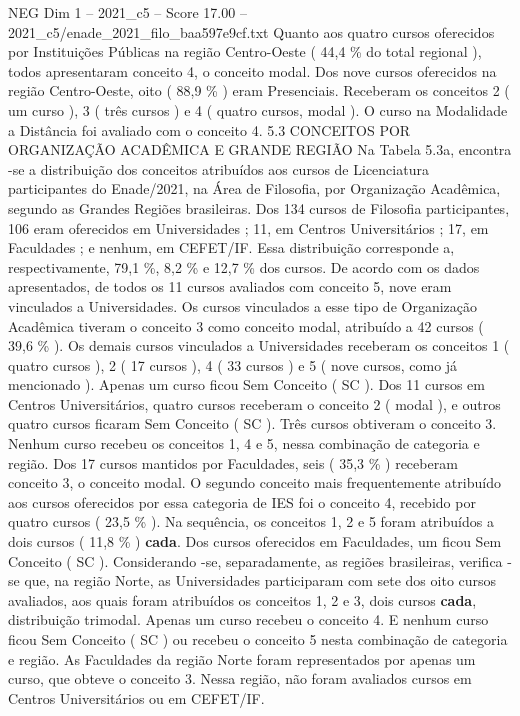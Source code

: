 \begin{textsample}{NEG Dim 1 – 2021\_c5 – Score 17.00 – 2021\_c5/enade\_2021\_filo\_baa597e9cf.txt}
Quanto aos quatro cursos oferecidos por Instituições Públicas na região Centro-Oeste ( 44,4 \% do total regional ), todos apresentaram conceito 4, o conceito modal.
Dos nove cursos oferecidos na região Centro-Oeste, oito ( 88,9 \% ) eram Presenciais.
Receberam os conceitos 2 ( um curso ), 3 ( três cursos ) e 4 ( quatro cursos, modal ).
O curso na Modalidade a Distância foi avaliado com o conceito 4. 5.3 CONCEITOS POR ORGANIZAÇÃO ACADÊMICA E GRANDE REGIÃO Na Tabela 5.3a, encontra -se a distribuição dos conceitos atribuídos aos cursos de Licenciatura participantes do Enade/2021, na Área de Filosofia, por Organização Acadêmica, segundo as Grandes Regiões brasileiras.
Dos 134 cursos de Filosofia participantes, 106 eram oferecidos em Universidades ; 11, em Centros Universitários ; 17, em Faculdades ; e nenhum, em CEFET/IF.
Essa distribuição corresponde a, respectivamente, 79,1 \%, 8,2 \% e 12,7 \% dos cursos.
De acordo com os dados apresentados, de todos os 11 cursos avaliados com conceito 5, nove eram vinculados a Universidades.
Os cursos vinculados a esse tipo de Organização Acadêmica tiveram o conceito 3 como conceito modal, atribuído a 42 cursos ( 39,6 \% ).
Os demais cursos vinculados a Universidades receberam os conceitos 1 ( quatro cursos ), 2 ( 17 cursos ), 4 ( 33 cursos ) e 5 ( nove cursos, como já mencionado ).
Apenas um curso ficou Sem Conceito ( SC ).
Dos 11 cursos em Centros Universitários, quatro cursos receberam o conceito 2 ( modal ), e outros quatro cursos ficaram Sem Conceito ( SC ).
Três cursos obtiveram o conceito 3.
Nenhum curso recebeu os conceitos 1, 4 e 5, nessa combinação de categoria e região.
Dos 17 cursos mantidos por Faculdades, seis ( 35,3 \% ) receberam conceito 3, o conceito modal.
O segundo conceito mais frequentemente atribuído aos cursos oferecidos por essa categoria de IES foi o conceito 4, recebido por quatro cursos ( 23,5 \% ).
Na sequência, os conceitos 1, 2 e 5 foram atribuídos a dois cursos ( 11,8 \% ) \textbf{cada}.
Dos cursos oferecidos em Faculdades, um ficou Sem Conceito ( SC ).
Considerando -se, separadamente, as regiões brasileiras, verifica -se que, na região Norte, as Universidades participaram com sete dos oito cursos avaliados, aos quais foram atribuídos os conceitos 1, 2 e 3, dois cursos \textbf{cada}, distribuição trimodal.
Apenas um curso recebeu o conceito 4.
E nenhum curso ficou Sem Conceito ( SC ) ou recebeu o conceito 5 nesta combinação de categoria e região.
As Faculdades da região Norte foram representados por apenas um curso, que obteve o conceito 3.
Nessa região, não foram avaliados cursos em Centros Universitários ou em CEFET/IF.

\end{textsample}
